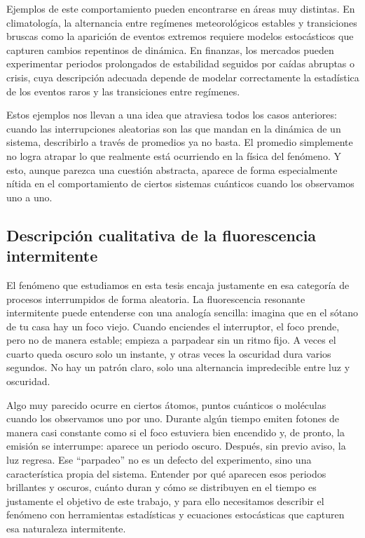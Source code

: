\documentclass[11pt]{report}
\begin{document}
Ejemplos de este comportamiento pueden encontrarse en áreas muy distintas.
En climatología, la alternancia entre regímenes meteorológicos estables y transiciones
bruscas como la aparición de eventos extremos requiere modelos estocásticos que
capturen cambios repentinos de dinámica. En finanzas, los mercados pueden experimentar
periodos prolongados de estabilidad seguidos por caídas abruptas o crisis, cuya
descripción adecuada depende de modelar correctamente la estadística de los eventos
raros y las transiciones entre regímenes.

Estos ejemplos nos llevan a una idea que atraviesa todos los casos anteriores: cuando las interrupciones aleatorias son las que mandan en la dinámica de un sistema, describirlo a través de promedios ya no basta. El promedio simplemente no logra atrapar lo que realmente está ocurriendo en la física del fenómeno. Y esto, aunque parezca una cuestión abstracta, aparece de forma especialmente nítida en el comportamiento de ciertos sistemas cuánticos cuando los observamos uno a uno.

\subsection{Descripción cualitativa de la fluorescencia intermitente}

El fenómeno que estudiamos en esta tesis encaja justamente en esa categoría de procesos interrumpidos de forma aleatoria. La fluorescencia resonante intermitente puede entenderse con una analogía sencilla: imagina que en el sótano de tu casa hay un foco viejo. Cuando enciendes el interruptor, el foco prende, pero no de manera estable; empieza a parpadear sin un ritmo fijo. A veces el cuarto queda oscuro solo un instante, y otras veces la oscuridad dura varios segundos. No hay un patrón claro, solo una alternancia impredecible entre luz y oscuridad.

Algo muy parecido ocurre en ciertos átomos, puntos cuánticos o moléculas cuando los observamos uno por uno. Durante algún tiempo emiten fotones de manera casi constante como si el foco estuviera bien encendido y, de pronto, la emisión se interrumpe: aparece un periodo oscuro. Después, sin previo aviso, la luz regresa. Ese “parpadeo” no es un defecto del experimento, sino una característica propia del sistema. Entender por qué aparecen esos periodos brillantes y oscuros, cuánto duran y cómo se distribuyen en el tiempo es justamente el objetivo de este trabajo, y para ello necesitamos describir el fenómeno con herramientas estadísticas y ecuaciones estocásticas que capturen esa naturaleza intermitente.
\end{document}
